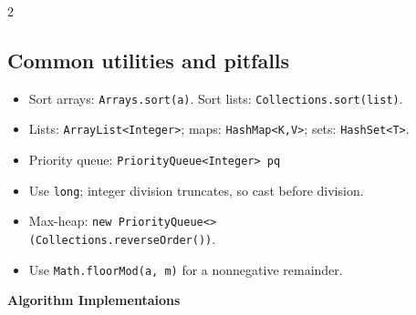 \documentclass[10pt]{article}
\newcommand{\code}[1]{\texttt{#1}}
\begin{document}
\begin{multicols}{2}
\subsection{Common utilities and pitfalls}
\begin{itemize}
  \item Sort arrays: \code{Arrays.sort(a)}.
    Sort lists: \code{Collections.sort(list)}.
  \item Lists: \code{ArrayList<Integer>}; maps:
    \code{HashMap<K,V>}; sets: \code{HashSet<T>}.
  \item Priority queue: \code{PriorityQueue<Integer> pq}
  \item Use \code{long}; integer division truncates, so cast before division.
  \item Max-heap: \code{new PriorityQueue<>}\\
    \code{(Collections.reverseOrder())}.
  \item Use \code{Math.floorMod(a, m)} for a nonnegative remainder.
\end{itemize}

\end{multicols}
\begin{center}
  {\Large\bfseries Algorithm Implementaions}
\end{center}
\end{document}
